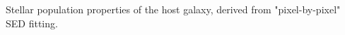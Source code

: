 \label{fig:HostProperties}
Stellar population properties of the \spock host galaxy, derived from "pixel-by-pixel" SED fitting. 